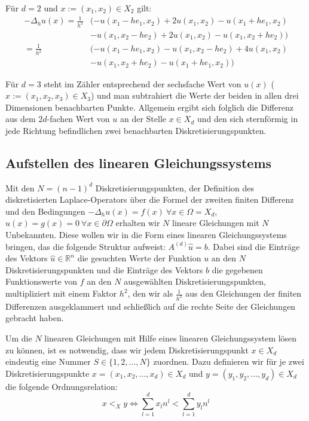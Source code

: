 \documentclass{scrartcl}
\newcommand{\R}{\mathbb{R}}
\begin{document}
Für $d=2$ und $x:=(x_1,x_2)\in X_2$ gilt:
\begin{align*}
    -\Delta_h u(x)=\frac{1}{h^2}&(-u(x_1-he_1,x_2)+2u(x_1,x_2)-u(x_1+he_1,x_2)\\
                   &-u(x_1,x_2-he_2)+2u(x_1,x_2)-u(x_1,x_2+he_2))\\
                  =\frac{1}{h^2}&(-u(x_1-he_1,x_2)-u(x_1,x_2-he_2)+4u(x_1,x_2)\\
                   &-u(x_1,x_2+he_2)-u(x_1+he_1,x_2))
\end{align*}

Für $d=3$ steht im Zähler entsprechend der sechsfache Wert von $u(x)$ ($x:=(x_1,x_2, x_3)\in X_3$) und man subtrahiert die Werte der beiden in allen drei Dimensionen benachbarten Punkte. Allgemein ergibt sich folglich die Differenz aus dem $2d$-fachen Wert von $u$ an der Stelle $x \in X_d$ und den sich sternförmig in jede Richtung befindlichen zwei benachbarten Diskretisierungspunkten.\cite{schwedt2016, rabus2019}

\subsection{Aufstellen des linearen Gleichungssystems}
Mit den $N=(n-1)^d$ Diskretisierungspunkten, der Definition des diskretisierten Laplace-Operators über die Formel der zweiten finiten Differenz und den Bedingungen
$-\Delta_h u(x) = f(x) \: \forall x \in \Omega = X_d$,
$u(x) = g(x) = 0 \: \forall x \in \partial\Omega$
erhalten wir $N$ lineare Gleichungen mit $N$ Unbekannten.
Diese wollen wir in die Form eines linearen Gleichungssystems bringen, das die folgende Struktur aufweist: $A^{(d)}\hat{u}=b$.
Dabei sind die Einträge des Vektors $\hat{u}\in\R^n$ die gesuchten Werte der Funktion $u$ an den $N$ Diskretisierungspunkten und die Einträge des Vektors $b$ die gegebenen Funktionswerte von $f$ an den $N$ ausgewählten Diskretisierungspunkten, multipliziert mit einem Faktor $h^2$, den wir als $\frac{1}{h^2}$ aus den Gleichungen der finiten Differenzen ausgeklammert und schließlich auf die rechte Seite der Gleichungen gebracht haben.

Um die $N$ linearen Gleichungen mit Hilfe eines linearen Gleichungssystem lösen zu können, ist es notwendig, dass wir jedem Diskretisierungspunkt $x \in X_d$ eindeutig eine Nummer $S \in \lbrace1, 2, ..., N\rbrace$ zuordnen. Dazu definieren wir für je zwei Diskretisierungspunkte $x=(x_1, x_2, ..., x_d) \in X_d$ und $y=(y_1, y_2, ..., y_d) \in X_d$ die folgende Ordnungsrelation:
\[x <_X y \iff \sum_{l=1}^d x_l n^l < \sum_{l=1}^d y_l n^l\]
\end{document}
